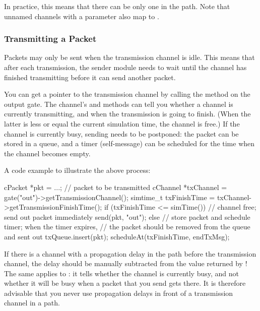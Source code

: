 \begin{ned}
\begin{note}
  In practice, this means that there can be only one 
  in the path. Note that unnamed channels with a  parameter
  also map to .
\end{note}

\subsubsection{Transmitting a Packet}
\label{sec:simple-modules:transmitting-a-packet}

Packets may only be sent when the transmission channel is idle.
This means that after each transmission, the sender module needs
to wait until the channel has finished transmitting before it can
send another packet.

You can get a pointer to the transmission channel by calling the
 method on the output gate.
The channel's  and 
methods can tell you whether a channel is currently transmitting,
and when the transmission is going to finish. (When the latter is
less or equal the current simulation time, the channel is free.)
If the channel is currently busy, sending needs to be postponed:
the packet can be stored in a queue, and a timer (self-message) can be
scheduled for the time when the channel becomes empty.

A code example to illustrate the above process:

\begin{cpp}
cPacket *pkt = ...; // packet to be transmitted
cChannel *txChannel = gate("out")->getTransmissionChannel();
simtime_t txFinishTime = txChannel->getTransmissionFinishTime();
if (txFinishTime <= simTime()) {
    // channel free; send out packet immediately
    send(pkt, "out");
}
else {
    // store packet and schedule timer; when the timer expires,
    // the packet should be removed from the queue and sent out
    txQueue.insert(pkt);
    scheduleAt(txFinishTime, endTxMsg);
}
\end{cpp}

\begin{note}
  If there is a channel with a propagation delay in
  the path before the transmission channel, the delay should be manually
  subtracted from the value returned by !
  The same applies to : it tells whether the channel is
  currently busy, and not whether it will be busy when a packet that you send
  gets there. It is therefore advisable that you never use propagation delays
  in front of a transmission channel in a path.
\end{note}


\end{ned}
